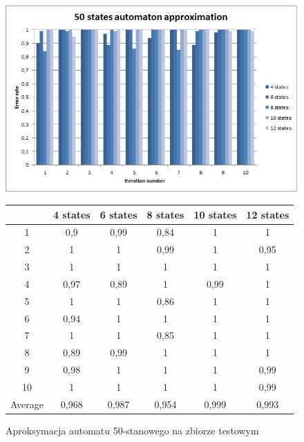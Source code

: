 \documentclass[runningheads,a4paper]{llncs}
\begin{document}
\begin{figure}[!htb]
\includegraphics[scale=0.92]{4.png}
\endminipage\hfill
\hspace{2.2cm}
\renewcommand{\arraystretch}{1.3}%
\begin{tabular}{@{}cccccc@{}}
\toprule
        & 4 states & 6 states & 8 states & 10 states & 12 states    \\ \midrule
1       & 0,9      & 0,99     & 0,84     & 1         & 1 \\
2       & 1        & 1        & 0,99     & 1         & 0,95 \\
3       & 1        & 1        & 1        & 1         & 1 \\
4       & 0,97     & 0,89     & 1        & 0,99      & 1   \\
5       & 1        & 1        & 0,86     & 1         & 1   \\
6       & 0,94     & 1        & 1        & 1         & 1    \\
7       & 1        & 1        & 0,85     & 1         & 1    \\
8       & 0,89     & 0,99     & 1        & 1         & 1     \\
9       & 0,98     & 1        & 1        & 1         & 0,99 \\
10      & 1        & 1        & 1        & 1         & 0,99  \\ \bottomrule
Average & 0,968    & 0,987    & 0,954    & 0,999     & 0,993  \\ \bottomrule
\end{tabular}
\vspace{4mm}
\endminipage\hfill
\caption{Aproksymacja automatu 50-stanowego na zbiorze testowym}
\end{figure}
\end{document}

